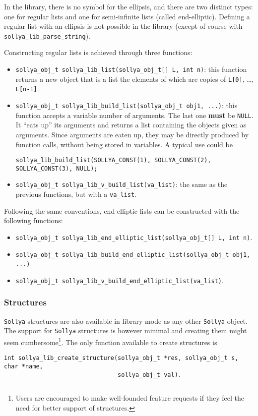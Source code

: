 \documentclass[a4paper]{article}
\newcommand{\sollya}{\texttt{Sollya}\xspace}
\begin{document}
In the library, there is no symbol for the ellipsis, and there are two distinct types: one for regular lists and one for semi-infinite lists (called end-elliptic). Defining a regular list with an ellipsis is not possible in the library (except of course with \texttt{sollya\_lib\_parse\_string}).

Constructing regular lists is achieved through three functions:
\begin{itemize}
\item \verb|sollya_obj_t sollya_lib_list(sollya_obj_t[] L, int n)|: this function returns a new object that is a list the elements of which are copies of \verb|L[0]|, \dots, \verb|L[n-1]|.
\item \verb|sollya_obj_t sollya_lib_build_list(sollya_obj_t obj1, ...)|: this function accepts a variable number of arguments. The last one \textbf{must} be \texttt{NULL}. It ``eats up'' its arguments and returns a list containing the objects given as arguments. Since arguments are eaten up, they may be directly produced by function calls, without being stored in variables. A typical use could be
  \begin{center}
    \verb|sollya_lib_build_list(SOLLYA_CONST(1), SOLLYA_CONST(2), SOLLYA_CONST(3), NULL);|
  \end{center}
\item \verb|sollya_obj_t sollya_lib_v_build_list(va_list)|: the same as the previous functions, but with a \texttt{va\_list}.
\end{itemize}

Following the same conventions, end-elliptic lists can be constructed with the following functions:
\begin{itemize}
\item \verb|sollya_obj_t sollya_lib_end_elliptic_list(sollya_obj_t[] L, int n)|.
\item \verb|sollya_obj_t sollya_lib_build_end_elliptic_list(sollya_obj_t obj1, ...)|.
\item \verb|sollya_obj_t sollya_lib_v_build_end_elliptic_list(va_list)|.
\end{itemize}

\subsubsection{Structures}
\label{creating_structures}
\sollya structures are also available in library mode as any other \sollya object. The support for \sollya structures is however minimal and creating them might seem cumbersome\footnote{Users are encouraged to make well-founded feature requests if they feel the need for better support of structures.}. The only function available to create structures is
\begin{center}
\verb|int sollya_lib_create_structure(sollya_obj_t *res, sollya_obj_t s, char *name,|\\
\verb|                                sollya_obj_t val).                             |
\end{center}
\end{document}
